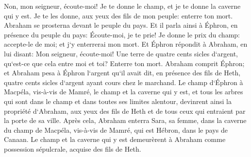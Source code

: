 \verse Non, mon seigneur, écoute-moi! Je te donne le champ, et je te donne la caverne qui y est. Je te les donne, aux yeux des fils de mon peuple: enterre ton mort. 
\verse Abraham se prosterna devant le peuple du pays. 
\verse Et il parla ainsi à Éphron, en présence du peuple du pays: Écoute-moi, je te prie! Je donne le prix du champ: accepte-le de moi; et j`y enterrerai mon mort. 
\verse Et Éphron répondit à Abraham, en lui disant: 
\verse Mon seigneur, écoute-moi! Une terre de quatre cents sicles d`argent, qu`est-ce que cela entre moi et toi? Enterre ton mort. 
\verse Abraham comprit Éphron; et Abraham pesa à Éphron l`argent qu`il avait dit, en présence des fils de Heth, quatre cents sicles d`argent ayant cours chez le marchand. 
\verse Le champ d`Éphron à Macpéla, vis-à-vis de Mamré, le champ et la caverne qui y est, et tous les arbres qui sont dans le champ et dans toutes ses limites alentour, 
\verse devinrent ainsi la propriété d`Abraham, aux yeux des fils de Heth et de tous ceux qui entraient par la porte de sa ville. 
\verse Après cela, Abraham enterra Sara, sa femme, dans la caverne du champ de Macpéla, vis-à-vis de Mamré, qui est Hébron, dans le pays de Canaan. 
\verse Le champ et la caverne qui y est demeurèrent à Abraham comme possession sépulcrale, acquise des fils de Heth. 

\chapter{}

